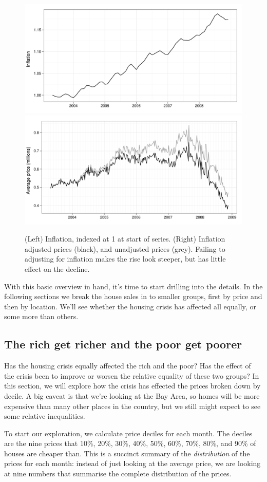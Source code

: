 \documentclass[oneside]{article}
\begin{document}
\begin{figure}[htbp]
  \centering
    \includegraphics[width=0.5 \linewidth]{daily-cpi}%
    \includegraphics[width=0.5 \linewidth]{daily-price-adj}
  \caption{(Left) Inflation, indexed at 1 at start of series.  (Right) Inflation adjusted prices (black), and unadjusted prices (grey).  Failing to adjusting for inflation makes the rise look steeper, but has little effect on the decline.}
  \label{fig:inflation}
\end{figure}

With this basic overview in hand, it's time to start drilling into the details. In the following sections we break the house sales in to smaller groups, first by price and then by location.  We'll see whether the housing crisis has affected all equally, or some more than others.

\subsection{The rich get richer and the poor get poorer}

Has the housing crisis equally affected the rich and the poor?  Has the effect of the crisis been to improve or worsen the relative equality of these two groups?  In this section, we will explore how the crisis has effected the prices broken down by decile.  A big caveat is that we're looking at the Bay Area, so homes will be more expensive than many other places in the country, but we still might expect to see some relative inequalities.

To start our exploration, we calculate price deciles for each month.  The deciles are the nine prices that 10\%, 20\%, 30\%, 40\%, 50\%, 60\%, 70\%, 80\%, and 90\% of houses are cheaper than.  This is a succinct summary of the {\it distribution} of the prices for each month: instead of just looking at the average price, we are looking at nine numbers that summarise the complete distribution of the prices. 
\end{document}
